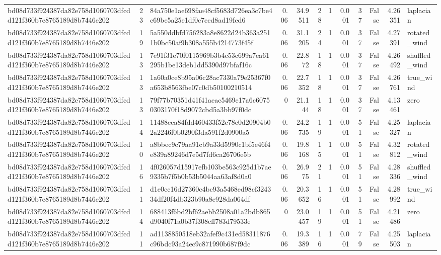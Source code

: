 \begin{tabular}{lrlrrrrrrrrl}
bd08d733f924387da82e758d1060703dfcdd121f360b7e8765189d8b7446e202 & 23 & 84a750e1ae698fae48cf5683d726ea3c7be4c69be5a25e1df0c7ecd8ad19fed6 & 0.06 & 34.9511 & 28 & 1 & 0.001 & 37 & False & 4.26351 & laplacian \\
bd08d733f924387da82e758d1060703dfcdd121f360b7e8765189d8b7446e202 & 19 & 5a550ddbfd756283a8e8622d24b363a2511b0bc50af9b308a555b4214773f45f & 0.06 & 31.1205 & 24 & 1 & 0.001 & 37 & False & 4.27391 & rotated\_wind \\
bd08d733f924387da82e758d1060703dfcdd121f360b7e8765189d8b7446e202 & 13 & 7e91f31e70f0115969b3b4c53c699a7ea61295b1be13deb1dd5390d97bfaf16c & 0.06 & 22.872 & 18 & 1 & 0.001 & 37 & False & 4.26492 & shuffled\_wind \\
bd08d733f924387da82e758d1060703dfcdd121f360b7e8765189d8b7446e202 & 13 & 1a60a0ce8b95a06c28ac7330a79e25367f0a653b8563fbe07c0db50100210514 & 0.06 & 22.7352 & 18 & 1 & 0.001 & 37 & False & 4.26761 & true\_wind \\
bd08d733f924387da82e758d1060703dfcdd121f360b7e8765189d8b7446e202 & 13 & 79f77b70351d41f41aeac5469e17a6c60750303170f18d9072cbd5a3bb97f0dc & 0 & 21.144 & 18 & 1 & 0.001 & 37 & False & 4.13461 & zero \\
bd08d733f924387da82e758d1060703dfcdd121f360b7e8765189d8b7446e202 & 14 & 11488eea84fdd460433f52c78e0d20904b02a2246f0b0290f3da591f2d0900a5 & 0.06 & 24.2735 & 19 & 1 & 0.001 & 51 & False & 4.25327 & laplacian \\
bd08d733f924387da82e758d1060703dfcdd121f360b7e8765189d8b7446e202 & 10 & a8bbec9c79aa91cb9a33d5990c1bf5e46f4e839a89246d7e5d7fd6ca26706e5b & 0.06 & 19.8168 & 15 & 1 & 0.001 & 51 & False & 4.32812 & rotated\_wind \\
bd08d733f924387da82e758d1060703dfcdd121f360b7e8765189d8b7446e202 & 16 & 4f026057d15917efb103be563c925d1b7ae9335b7f5b0b53b5044aa63af8d0a0 & 0.06 & 26.975 & 21 & 1 & 0.001 & 51 & False & 4.28336 & shuffled\_wind \\
bd08d733f924387da82e758d1060703dfcdd121f360b7e8765189d8b7446e202 & 11 & d1e0cc16d27360c4bc93a5468ed98cf324334df20f4db323b90a8e928da064df & 0.06 & 20.3652 & 16 & 1 & 0.001 & 51 & False & 4.28992 & true\_wind \\
bd08d733f924387da82e758d1060703dfcdd121f360b7e8765189d8b7446e202 & 14 & 688413f6bd2bf62aebb2508a01a2bdb865d9040f71a0b37f308cff783d79533e & 0 & 23.0457 & 19 & 1 & 0.001 & 51 & False & 4.21486 & zero \\
bd08d733f924387da82e758d1060703dfcdd121f360b7e8765189d8b7446e202 & 11 & ad1138850518eb32afef9c431ed58311876c96bdc93a24ec9c871990b687f9dc & 0.06 & 19.3389 & 16 & 1 & 0.001 & 79 & False & 4.25503 & laplacian \\

\end{tabular}

